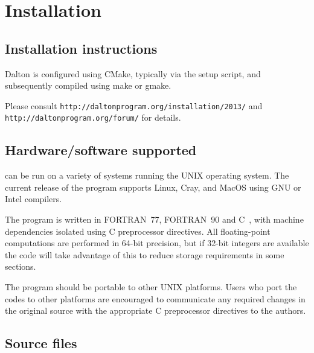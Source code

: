 \chapter{Installation}\label{ch:install}

\section{Installation instructions}

Dalton is configured using CMake, typically via the setup script,
and subsequently compiled using make or gmake.

Please consult \verb|http://daltonprogram.org/installation/2013/|
and \verb|http://daltonprogram.org/forum/| for details.

\section{Hardware/software
supported}\label{sec:hardsoft}

{\dalton} can be run on a variety of systems running the UNIX operating system.
The current release of the program supports Linux, Cray, and
MacOS using GNU or Intel compilers.

The program is written in FORTRAN~77,
FORTRAN~90 and C~, with machine dependencies
isolated using C preprocessor directives.  All
floating-point computations are performed in 64-bit precision, but if 32-bit
integers are available the code will take advantage of this to reduce storage
requirements in some sections.

The program should be portable to other UNIX platforms.  Users
who port the codes to other platforms are encouraged to communicate any
required changes in the original source with the appropriate C preprocessor
directives to the authors.

\section{Source files}\label{sec:source}

